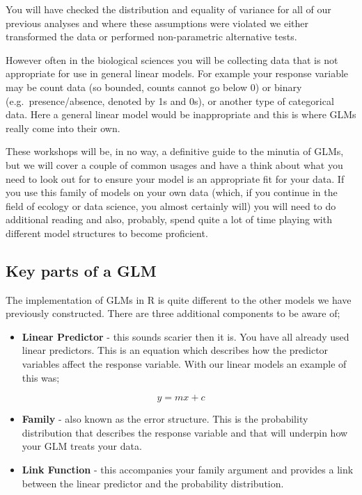 \documentclass[
]{book}
\providecommand{\tightlist}{%
  \setlength{\itemsep}{0pt}\setlength{\parskip}{0pt}}
\begin{document}
You will have checked the distribution and equality of variance for all of our previous analyses and where these assumptions were violated we either transformed the data or performed non-parametric alternative tests.

However often in the biological sciences you will be collecting data that is not appropriate for use in general linear models. For example your response variable may be count data (so bounded, counts cannot go below 0) or binary (e.g.~presence/absence, denoted by 1s and 0s), or another type of categorical data. Here a general linear model would be inappropriate and this is where GLMs really come into their own.

These workshops will be, in no way, a definitive guide to the minutia of GLMs, but we will cover a couple of common usages and have a think about what you need to look out for to ensure your model is an appropriate fit for your data. If you use this family of models on your own data (which, if you continue in the field of ecology or data science, you almost certainly will) you will need to do additional reading and also, probably, spend quite a lot of time playing with different model structures to become proficient.

\subsection{Key parts of a GLM}\label{key-parts-of-a-glm}

The implementation of GLMs in R is quite different to the other models we have previously constructed. There are three additional components to be aware of;

\begin{itemize}
\tightlist
\item
  \textbf{Linear Predictor} - this sounds scarier then it is. You have all already used linear predictors. This is an equation which describes how the predictor variables affect the response variable. With our linear models an example of this was;
\end{itemize}

\[
y = mx + c
\]

\begin{itemize}
\tightlist
\item
  \textbf{Family} - also known as the error structure. This is the probability distribution that describes the response variable and that will underpin how your GLM treats your data.
\item
  \textbf{Link Function} - this accompanies your family argument and provides a link between the linear predictor and the probability distribution.
\end{itemize}
\end{document}
